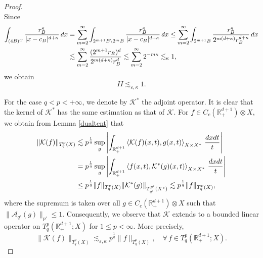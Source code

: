 \documentclass[oneside,english,a4wide]{amsart}
\numberwithin{equation}{section}
\numberwithin{figure}{section}
\theoremstyle{plain}
\theoremstyle{plain}
\theoremstyle{definition}
\theoremstyle{plain}
\theoremstyle{remark}
\theoremstyle{definition}
\theoremstyle{remark}
\theoremstyle{definition}
\newcommand{\real}{{\mathbb R}}
\newcommand{\A}{{\mathcal A}}
\newcommand{\e}{\varepsilon}
\newcommand{\8}{+\infty}
\renewcommand{\1}{\mathbbm{1}}
\newcommand{\K}{{\mathcal K}}
\newcommand\jdz[1]{ \left| #1 \right| }
\newcommand{\lara}[1]{\left\langle #1 \right\rangle}
\renewcommand\d{{\rm d}}
\begin{document}
{\begin{proof}
\[\]
Since 
\[
\begin{aligned}
    \int_{(4B)^C} \frac{ r_B^{ \kappa }}{ |x - c_B|^{d + \kappa} } \,\d x  & = \sum_{m = 2}^{\infty} \int_{ 2^{m+1}B \setminus 2^{m}B }\frac{ r_B^{ \kappa } }{ |x - c_B|^{d + \kappa } } \,\d x \leq \sum_{m = 2}^{\infty} \int_{ 2^{m+1}B } \frac{ r_B^{ \kappa } }{ 2^{m(d + \kappa) }r_B^{d + \kappa} } \,\d x \\ 
    & \lesssim \sum_{m = 2}^{\infty}  \frac{ (2^{m+1}r_B)^d }{ 2^{m(d +  \kappa) }r_B^{d } }  \lesssim \sum_{m = 2}^{\infty} 2^{-m\kappa}   \lesssim_{\kappa} 1 ,
\end{aligned}
\]
we obtain
\begin{equation}\label{esII}
        II  \lesssim_{\e, \kappa} 1.
\end{equation}


For the case $q < p < + \infty$, we denote by $\K^*$ the adjoint operator. It is clear that the kernel of $\K^*$ has the same estimation as that of $\K$. For $f\in C_c(\real^{d+1}_+)\otimes X$, we obtain from Lemma \ref{dualtent} that
\[
\begin{aligned}
    \| \K(f) \|_{T^p_q(X)} & \lesssim p^{\frac{1}{q}}\sup_{g} \jdz{ \int_{\real^{d+1}_+} \lara{ \K(f)(x, t), g(x, t) }_{X \times X^*} \,\frac{\d x\d t}{t} } \\
    & = p^{\frac{1}{q}}\sup_{g} \jdz{ \int_{\real^{d+1}_+} \lara{ f(x, t), \K^*(g)(x, t) }_{X \times X^*} \,\frac{\d x\d t}{t} } \\
    & \leq p^{\frac{1}{q}}\| f \|_{T^p_q(X)} \| \K^*(g) \|_{T^{p'}_{q'}(X^*)} \lesssim p^{\frac{1}{q}} \| f \|_{T^p_q(X)},
\end{aligned}
\]
where the supremum is taken over all $g \in C_c(\real^{d+1}_+)\otimes X$ such that $\| \A_{q'}(g) \|_{p'} \leq 1$. Consequently, we observe that $\K$ extends to a bounded linear operator on $T^p_q(\real^{d+1}_+; X)$ for $1 \leq p < \infty$. More precisely,
\[
    \| \K(f) \|_{T^p_q(X)} \lesssim_{\e, \kappa} p^{\frac{1}{q}}\| f \|_{T^p_q(X)}, \quad \forall\, f \in T^p_q(\real^{d+1}_+; X).
\]


\end{proof}}
\end{document}
